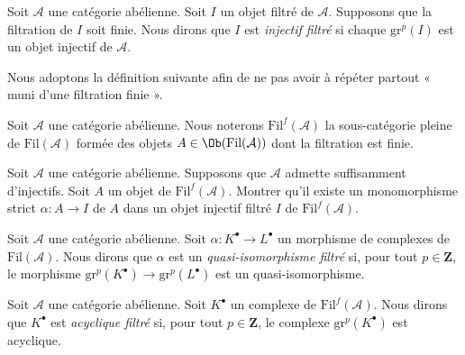 \begin{definition}
\label{definition-injective-filtered}
Soit $\mathcal{A}$ une catégorie abélienne.
Soit $I$ un objet filtré de $\mathcal{A}$.
Supposons que la filtration de $I$ soit finie.
Nous dirons que $I$ est {\it injectif filtré} si chaque $\text{gr}^p(I)$ est
un objet injectif de $\mathcal{A}$.
\end{definition}

\noindent
Nous adoptons la définition suivante afin de ne pas avoir à répéter
partout « muni d'une filtration finie ».

\begin{definition}
\label{definition-finite-filtration-category}
Soit $\mathcal{A}$ une catégorie abélienne.
Nous noterons {\it $\text{Fil}^f(\mathcal{A})$} la sous-catégorie pleine
de $\text{Fil}(\mathcal{A})$ formée des objets
$A \in \Ob(\text{Fil}(\mathcal{A}))$
dont la filtration est finie.
\end{definition}

\begin{exercise}
\label{exercise-inject-into-injective}
Soit $\mathcal{A}$ une catégorie abélienne.
Supposons que $\mathcal{A}$ admette suffisamment d'injectifs.
Soit $A$ un objet de $\text{Fil}^f(\mathcal{A})$.
Montrer qu'il existe un monomorphisme strict $\alpha : A \to I$
de $A$ dans un objet injectif filtré $I$ de $\text{Fil}^f(\mathcal{A})$.
\end{exercise}

\begin{definition}
\label{definition-filtered-quasi-isomorphism}
Soit $\mathcal{A}$ une catégorie abélienne.
Soit $\alpha : K^\bullet \to L^\bullet$ un morphisme de
complexes de $\text{Fil}(\mathcal{A})$. Nous dirons que
$\alpha$ est un {\it quasi-isomorphisme filtré} si,
pour tout $p \in \mathbf{Z}$, le morphisme
$\text{gr}^p(K^\bullet) \to \text{gr}^p(L^\bullet)$ est
un quasi-isomorphisme.
\end{definition}

\begin{definition}
\label{definition-filtered-acyclic}
Soit $\mathcal{A}$ une catégorie abélienne.
Soit $K^\bullet$ un complexe de $\text{Fil}^f(\mathcal{A})$.
Nous dirons que $K^\bullet$ est {\it acyclique filtré} si,
pour tout $p \in \mathbf{Z}$, le complexe $\text{gr}^p(K^\bullet)$ est
acyclique.
\end{definition}

